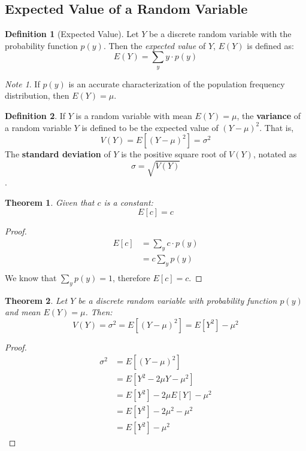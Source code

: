 \documentclass{article}
\theoremstyle{plain}
\newtheorem{thm}{Theorem}[section]
\theoremstyle{definition}
\newtheorem{defn}{Definition}[section]
\theoremstyle{remark}
\newtheorem*{note}{Note}
\begin{document}
\subsection{Expected Value of a Random Variable}
\begin{defn}[Expected Value] 
Let $Y$ be a discrete random variable with the probability function $p(y)$. Then the \textit{expected value} of $Y$, $E(Y)$ is defined as:
$$
E(Y) = \displaystyle \sum_{y}y\cdot p(y)
$$
\end{defn}

\begin{note}
If $p(y)$ is an accurate characterization of the population frequency distribution, then $E(Y) = \mu$.
\end{note}

\begin{defn}
If $Y$ is a random variable with mean $E(Y) = \mu$, the \textbf{variance} of a random variable $Y$ is defined to be the expected value of $(Y - \mu)^2$. That is,
$$
V(Y) = E[(Y - \mu)^2] = \sigma^2
$$
The \textbf{standard deviation} of $Y$ is the positive square root of $V(Y)$, notated as $$
\sigma = \sqrt{V(Y)}
$$.
\end{defn}

\begin{thm}
Given that $c$ is a constant:
$$E[c] = c$$
\end{thm}
\begin{proof}
  \begin{align*}
    E[c] &= \displaystyle \sum_{y} c \cdot p(y)\\
    &= c \displaystyle \sum_{y} p(y)\\   
  \end{align*}
We know that $\sum_{y} p(y) = 1$, therefore $E[c] = c$.
\end{proof}

\begin{thm}
  Let $Y$ be a discrete random variable with probability function $p(y)$ and mean $E(Y) = \mu$. Then:
$$
V(Y) = \sigma^2 = E[(Y - \mu)^2] = E[Y^2] - \mu^2
$$
\end{thm}
\begin{proof}
  \begin{align*}
    \sigma^2 &= E[(Y - \mu)^2]\\
    &= E[Y^2 - 2\mu Y - \mu^2]\\
    &= E[Y^2] - 2\mu E[Y] - \mu^2\\
    &= E[Y^2] - 2 \mu ^2 - \mu^2\\
    &= E[Y^2] - \mu ^2
  \end{align*}
\end{proof}
\end{document}
